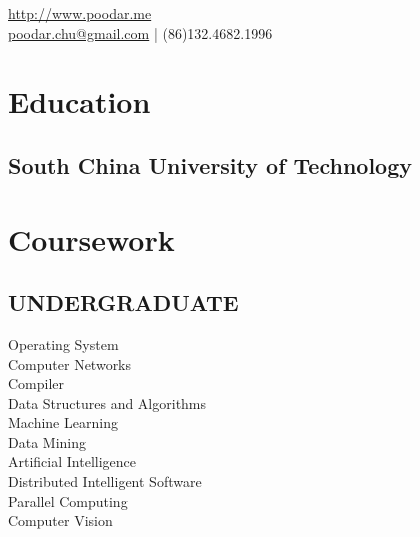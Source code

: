 \documentclass[]{deedy-resume-openfont}
\begin{document}
%
%

%
%


 { %
	\url{http://www.poodar.me} \\
	\href{mailto:poodarchu@gmail.com}{poodar.chu@gmail.com} | (86)132.4682.1996 %
}

%
%

\begin{minipage}[t]{0.30\textwidth} 


\section{Education} 

\subsection{South China University of Technology}

\sectionsep


\section{Coursework}

\subsection{UNDERGRADUATE}
Operating System \\
Computer Networks \\
Compiler \\
Data Structures and Algorithms \\
Machine Learning \\
Data Mining \\
Artificial Intelligence\\
Distributed Intelligent Software \\
Parallel Computing \\
Computer Vision


\end{minipage}
\end{document}
